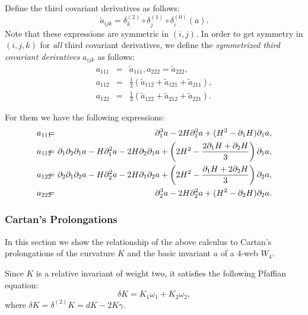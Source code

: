 \documentclass{article}
\begin{document}
Define the third covariant derivatives as follows:
\begin{equation*}
\widetilde{a}_{ijk}=\delta _{k}^{\left( 2\right) }\circ \delta _{j}^{\left(
1\right) }\circ \delta _{i}^{(0)}\left( a\right) .
\end{equation*}%
Note that these expressions are symmetric in $\left( i,j\right) .$ In order
to get symmetry in $\left( i,j,k\right) $ for \emph{all} third covariant
derivatives, we define the \emph{symmetrized third covariant derivatives }$%
a_{ijk}$ as follows:\emph{\ }
\begin{eqnarray*}
a_{111} &\!\!\!\!=&\!\!\!\!\widetilde{a}_{111},a_{222}=\widetilde{a}_{222},
\\
a_{112} &\!\!\!\!=&\!\!\!\!\frac{1}{3}\left( \widetilde{a}_{112}+\widetilde{a%
}_{121}+\widetilde{a}_{211}\right) , \\
a_{122} &\!\!\!\!=&\!\!\!\!\frac{1}{3}\left( \widetilde{a}_{122}+\widetilde{a%
}_{212}+\widetilde{a}_{221}\right) .
\end{eqnarray*}

For them we have the following expressions:
\begin{eqnarray*}
a_{111} &\!\!\!\!=&\!\!\!\!\partial _{1}^{3}a-2H\partial
_{1}^{2}a+(H^{2}-\partial _{1}H)\partial _{1}a, \\
a_{112} &\!\!\!\!=&\!\!\!\!\partial _{1}\partial _{2}\partial
_{1}a-H\partial _{1}^{2}a-2H\partial _{2}\partial _{1}a+\left( 2H^{2}-\frac{%
2\partial _{1}H+\partial _{2}H}{3}\right) \partial _{1}a, \\
a_{122} &\!\!\!\!=&\!\!\!\!\partial _{2}\partial _{1}\partial
_{2}a-H\partial _{2}^{2}a-2H\partial _{1}\partial _{2}a+\left( 2H^{2}-\frac{%
\partial _{1}H+2\partial _{2}H}{3}\right) \partial _{2}a, \\
a_{222} &\!\!\!\!=&\!\!\!\!\partial _{2}^{3}a-2H\partial
_{2}^{2}a+(H^{2}-\partial _{2}H)\partial _{2}a.
\end{eqnarray*}

\subsubsection{ Cartan's Prolongations}

In this section we show the relationship of the above calculus to Cartan's
prolongations of the curvature $K$ and the basic invariant $a$ of a $4$-web $%
W_{4}$.

Since $K$ is a relative invariant of weight two, it satisfies the following
Pfaffian equation:
\begin{equation*}
\delta K=K_{1}\omega _{1}+K_{2}\omega _{2},
\end{equation*}%
where $\delta K=\delta ^{(2)}K=dK-2K\gamma .$
\end{document}
